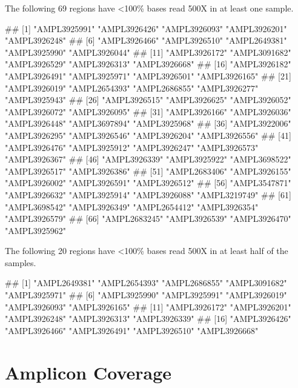 \documentclass[
]{article}
\newenvironment{Shaded}{}{}
\newcommand{\NormalTok}[1]{#1}
\begin{document}
The following 69 regions have \textless100\% bases read 500X in at least one sample.

\begin{Shaded}
\begin{Highlighting}[]
\NormalTok{\#\#  [1] "AMPL3925991" "AMPL3926426" "AMPL3926093" "AMPL3926201" "AMPL3926248"}
\NormalTok{\#\#  [6] "AMPL3926466" "AMPL3926510" "AMPL2649381" "AMPL3925990" "AMPL3926044"}
\NormalTok{\#\# [11] "AMPL3926172" "AMPL3091682" "AMPL3926529" "AMPL3926313" "AMPL3926668"}
\NormalTok{\#\# [16] "AMPL3926182" "AMPL3926491" "AMPL3925971" "AMPL3926501" "AMPL3926165"}
\NormalTok{\#\# [21] "AMPL3926019" "AMPL2654393" "AMPL2686855" "AMPL3926277" "AMPL3925943"}
\NormalTok{\#\# [26] "AMPL3926515" "AMPL3926625" "AMPL3926052" "AMPL3926072" "AMPL3926095"}
\NormalTok{\#\# [31] "AMPL3926166" "AMPL3926036" "AMPL3926448" "AMPL3697894" "AMPL3925968"}
\NormalTok{\#\# [36] "AMPL3922006" "AMPL3926295" "AMPL3926546" "AMPL3926204" "AMPL3926556"}
\NormalTok{\#\# [41] "AMPL3926476" "AMPL3925912" "AMPL3926247" "AMPL3926573" "AMPL3926367"}
\NormalTok{\#\# [46] "AMPL3926339" "AMPL3925922" "AMPL3698522" "AMPL3926517" "AMPL3926386"}
\NormalTok{\#\# [51] "AMPL2683406" "AMPL3926155" "AMPL3926002" "AMPL3926591" "AMPL3926512"}
\NormalTok{\#\# [56] "AMPL3547871" "AMPL3926632" "AMPL3925914" "AMPL3926088" "AMPL3219749"}
\NormalTok{\#\# [61] "AMPL3698542" "AMPL3926349" "AMPL2654412" "AMPL3926354" "AMPL3926579"}
\NormalTok{\#\# [66] "AMPL2683245" "AMPL3926539" "AMPL3926470" "AMPL3925962"}
\end{Highlighting}
\end{Shaded}

The following 20 regions have \textless100\% bases read 500X in at least half of the samples.

\begin{Shaded}
\begin{Highlighting}[]
\NormalTok{\#\#  [1] "AMPL2649381" "AMPL2654393" "AMPL2686855" "AMPL3091682" "AMPL3925971"}
\NormalTok{\#\#  [6] "AMPL3925990" "AMPL3925991" "AMPL3926019" "AMPL3926093" "AMPL3926165"}
\NormalTok{\#\# [11] "AMPL3926172" "AMPL3926201" "AMPL3926248" "AMPL3926313" "AMPL3926339"}
\NormalTok{\#\# [16] "AMPL3926426" "AMPL3926466" "AMPL3926491" "AMPL3926510" "AMPL3926668"}
\end{Highlighting}
\end{Shaded}

\newpage

\hypertarget{amplicon-coverage}{%
\section{Amplicon Coverage}\label{amplicon-coverage}}
\end{document}
